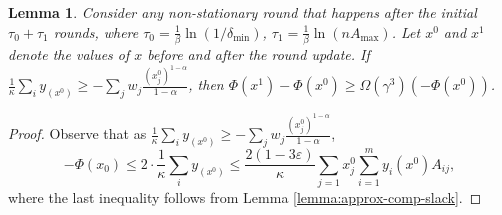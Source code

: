 \documentclass[11pt]{article}
\newtheorem{lemma}[theorem]{Lemma}
\begin{document}
\begin{lemma}\label{lemma:alpha>1-large-sum-yi}
Consider any non-stationary round that happens after the initial $\tau_0 + \tau_1$ rounds, where $\tau_0 = \frac{1}{\beta}\ln(1/\delta_{\min})$, $\tau_1 = \frac{1}{\beta}\ln(nA_{\max})$. Let $x^0$ and $x^1$ denote the values of $x$ before and after the round update. If $\frac{1}{\kappa}\sum_i y_(x^0) \geq -\sum_j w_j \frac{{(x_j^0)}^{1-\alpha}}{1-\alpha}$, then $\Phi(x^1) - \Phi(x^0)\geq \Omega(\gamma^3)(-\Phi(x^0))$.
\end{lemma}
\begin{proof}
Observe that as $\frac{1}{\kappa}\sum_i y_(x^0) \geq -\sum_j w_j \frac{{(x_j^0)}^{1-\alpha}}{1-\alpha}$,
\begin{equation*}
-\Phi(x_0)\leq 2\cdot\frac{1}{\kappa}\sum_i y_(x^0)\leq \frac{2(1-3\varepsilon)}{\kappa} \sum_{j=1}x_j^0 \sum_{i=1}^m y_i(x^0)A_{ij},
\end{equation*}
where the last inequality follows from Lemma \ref{lemma:approx-comp-slack}.


\end{proof}
\end{document}
